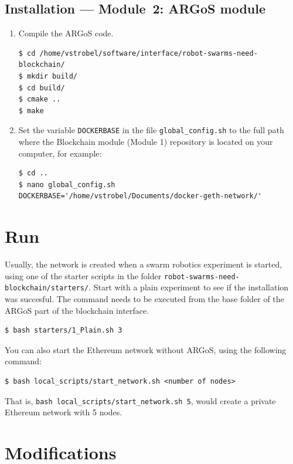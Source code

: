 \documentclass{article}
\begin{document}
\subsection{Installation --- Module~2: ARGoS module}

\begin{enumerate}
\item Compile the ARGoS code.
\begin{verbatim}
$ cd /home/vstrobel/software/interface/robot-swarms-need-blockchain/
$ mkdir build/
$ cd build/
$ cmake ..
$ make
\end{verbatim}
  
\item Set the variable \verb|DOCKERBASE| in the file
\verb|global_config.sh| to the full path where the Blockchain module
(Module 1) repository is located on your computer, for example:

\begin{verbatim}
$ cd ..
$ nano global_config.sh
DOCKERBASE='/home/vstrobel/Documents/docker-geth-network/'
\end{verbatim}
\end{enumerate}

\section{Run}

Usually, the network is created when a swarm robotics experiment is
started, using one of the starter scripts in the folder
\verb|robot-swarms-need-blockchain/starters/|. Start with a plain
experiment to see if the installation was succesful. The command needs
to be executed from the base folder of the ARGoS part of the
blockchain interface.

\begin{verbatim}
$ bash starters/1_Plain.sh 3
\end{verbatim}

You can also start the Ethereum network without ARGoS, using
the following command:

\begin{verbatim}
$ bash local_scripts/start_network.sh <number of nodes>
\end{verbatim}

That is, \verb|bash local_scripts/start_network.sh 5|, would create a
private Ethereum network with 5 nodes.


\section{Modifications}
\end{document}
